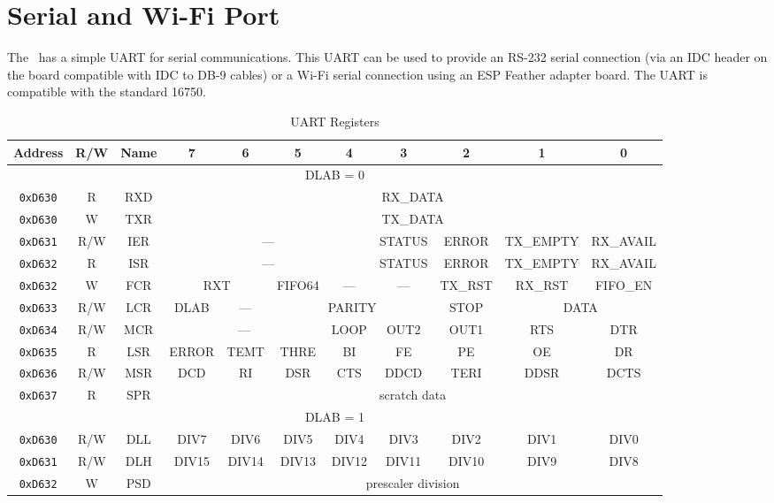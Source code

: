 \chapter{Serial and Wi-Fi Port}

The \jr\ has a simple UART for serial communications. This UART can be used to provide an RS-232 serial connection (via an IDC header on the board compatible with IDC to DB-9 cables) or a Wi-Fi serial connection using an ESP Feather adapter board. The UART is compatible with the standard 16750.

\begin{table}[ht]
    \begin{center}
        \begin{tabular}{|c|c|c|c|c|c|c|c|c|c|c|} \hline
            Address & R/W & Name & 7 & 6 & 5 & 4 & 3 & 2 & 1 & 0 \\\hline\hline
            \multicolumn{11}{|c|}{DLAB = 0} \\ \hline
            \verb+0xD630+ & R & RXD & \multicolumn{8}{|c|}{RX\_DATA} \\ \hline
            \verb+0xD630+ & W & TXR & \multicolumn{8}{|c|}{TX\_DATA} \\ \hline
            \verb+0xD631+ & R/W & IER & \multicolumn{4}{|c|}{---} & STATUS & ERROR & TX\_EMPTY & RX\_AVAIL \\ \hline
            \verb+0xD632+ & R & ISR & \multicolumn{4}{|c|}{---} & STATUS & ERROR & TX\_EMPTY & RX\_AVAIL \\ \hline
            \verb+0xD632+ & W & FCR & \multicolumn{2}{|c|}{RXT} & FIFO64 & --- & --- & TX\_RST & RX\_RST & FIFO\_EN \\ \hline
            \verb+0xD633+ & R/W & LCR & DLAB & --- & \multicolumn{3}{|c|}{PARITY} & STOP & \multicolumn{2}{|c|}{DATA} \\ \hline
            \verb+0xD634+ & R/W & MCR & \multicolumn{3}{|c|}{---} & LOOP & OUT2 & OUT1 & RTS & DTR \\ \hline
            \verb+0xD635+ & R & LSR & ERROR & TEMT & THRE & BI & FE & PE & OE & DR \\ \hline
            \verb+0xD636+ & R/W & MSR & DCD & RI & DSR & CTS & DDCD & TERI & DDSR & DCTS \\ \hline
            \verb+0xD637+ & R & SPR & \multicolumn{8}{|c|}{scratch data} \\ \hline\hline

            \multicolumn{11}{|c|}{DLAB = 1} \\ \hline
            \verb+0xD630+ & R/W & DLL & DIV7 & DIV6 & DIV5 & DIV4 & DIV3 & DIV2 & DIV1 & DIV0 \\ \hline
            \verb+0xD631+ & R/W & DLH & DIV15 & DIV14 & DIV13 & DIV12 & DIV11 & DIV10 & DIV9 & DIV8 \\ \hline
            \verb+0xD632+ & W & PSD & \multicolumn{8}{|c|}{prescaler division} \\ \hline
        \end{tabular}
    \end{center}
    \caption{UART Registers}
    \label{tab:uart_reg}
\end{table}

